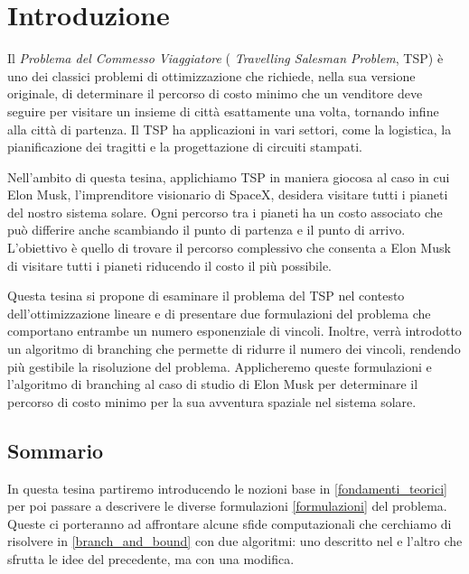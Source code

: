 \chapter{Introduzione}

Il \textit{Problema del Commesso Viaggiatore} ( \textit{Travelling Salesman Problem}, TSP) è uno dei classici problemi di ottimizzazione che richiede, nella sua versione originale, di determinare il percorso di costo minimo che un venditore deve seguire per visitare un insieme di città esattamente una volta, tornando infine alla città di partenza. Il TSP ha applicazioni in vari settori, come la logistica, la pianificazione dei tragitti e la progettazione di circuiti stampati.

Nell'ambito di questa tesina, applichiamo TSP in maniera giocosa al caso in cui Elon Musk, l'imprenditore visionario di SpaceX, desidera visitare tutti i pianeti del nostro sistema solare. Ogni percorso tra i pianeti ha un costo associato che può differire anche scambiando il punto di partenza e il punto di arrivo. L’obiettivo è quello di trovare il percorso complessivo che consenta a Elon Musk di visitare tutti i pianeti riducendo il costo il più possibile.

Questa tesina si propone di esaminare il problema del TSP nel contesto dell'ottimizzazione lineare e di presentare due formulazioni del problema che comportano entrambe un numero esponenziale di vincoli. Inoltre, verrà introdotto un algoritmo di branching che permette di ridurre il numero dei vincoli, rendendo più gestibile la risoluzione del problema. Applicheremo queste formulazioni e l'algoritmo di branching al caso di studio di Elon Musk per determinare il percorso di costo minimo per la sua avventura spaziale nel sistema solare.


\section{Sommario}

In questa tesina partiremo introducendo le nozioni base in \ref{fondamenti_teorici} per poi passare a descrivere le diverse formulazioni \ref{formulazioni} del problema. Queste ci porteranno ad affrontare alcune sfide computazionali che cerchiamo di risolvere in \ref{branch_and_bound} con due algoritmi: uno descritto nel \cite{bertsimas} e l'altro che sfrutta le idee del precedente, ma con una modifica.
